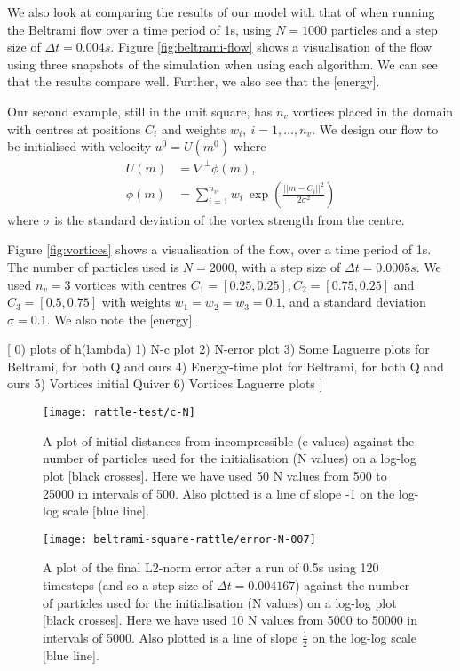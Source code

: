 \documentclass[11pt, oneside]{article}   	%
\newcommand{\dt}{\Delta t}
\begin{document}
We also look at comparing the results of our model with that of \cite{gallouet2016lagrangian} when running the Beltrami flow over a time period of 1s, using \(N = 1000\) particles and a step size of \(\dt = 0.004s\). Figure \ref{fig:beltrami-flow} shows a visualisation of the flow using three snapshots of the simulation when using each algorithm. We can see that the results compare well. Further, we also see that the [energy].
 
Our second example, still in the unit square, has \(n_v\) vortices placed in the domain with centres at positions \(C_i\) and weights \(w_i, \: i = 1,\dots,n_v\). We design our flow to be initialised with velocity \(u^0 = U(m^0)\) where
\begin{align}
U(m) &= \nabla^\perp \phi(m), \\
\phi(m) &= \sum_{i=1}^{n_v} w_i \: \exp(\frac{|| m - C_i ||^2}{2 \sigma^2})
\end{align}
where \(\sigma\) is the standard deviation of the vortex strength from the centre.

Figure \ref{fig:vortices} shows a visualisation of the flow, over a time period of 1s. The number of particles used is \(N = 2000\), with a step size of \(\dt = 0.0005s\). We used \(n_v = 3\) vortices with centres \(C_1 = [0.25, 0.25], C_2 = [0.75, 0.25] \) and \(C_3 = [0.5, 0.75]\) with weights \(w_1 = w_2 = w_3 = 0.1\), and a standard deviation \(\sigma = 0.1\). We also note the [energy].

[
0) plots of h(lambda)
1) N-c plot
2) N-error plot
3) Some Laguerre plots for Beltrami, for both Q and ours
4) Energy-time plot for Beltrami, for both Q and ours
5) Vortices initial Quiver
6) Vortices Laguerre plots
]

\begin{figure}[h]
\texttt{[image: rattle-test/c-N]}
\centering
\caption{A plot of initial distances from incompressible (c values) against the number of particles used for the initialisation (N values) on a log-log plot [black crosses]. Here we have used 50 N values from 500 to 25000 in intervals of 500. Also plotted is a line of slope -1 on the log-log scale [blue line].}
\centering
\label{fig:c-N}
\end{figure}

\begin{figure}[h]
\texttt{[image: beltrami-square-rattle/error-N-007]}
\centering
\caption{A plot of the final L2-norm error after a run of 0.5s using 120 timesteps (and so a step size of \(\dt = 0.004167\)) against the number of particles used for the initialisation (N values) on a log-log plot [black crosses]. Here we have used 10 N values from 5000 to 50000 in intervals of 5000. Also plotted is a line of slope \(\frac{1}{2}\) on the log-log scale [blue line].}
\centering
\label{fig:error-N}
\end{figure}
\end{document}
